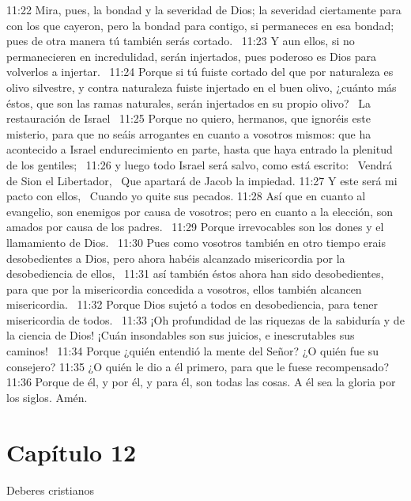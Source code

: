 11:22 Mira, pues, la bondad y la severidad de Dios; la severidad ciertamente para con los que cayeron, pero la bondad para contigo, si permaneces en esa bondad; pues de otra manera tú también serás cortado.  
11:23 Y aun ellos, si no permanecieren en incredulidad, serán injertados, pues poderoso es Dios para volverlos a injertar.  
11:24 Porque si tú fuiste cortado del que por naturaleza es olivo silvestre, y contra naturaleza fuiste injertado en el buen olivo, ¿cuánto más éstos, que son las ramas naturales, serán injertados en su propio olivo?  
La restauración de Israel  
11:25 Porque no quiero, hermanos, que ignoréis este misterio, para que no seáis arrogantes en cuanto a vosotros mismos: que ha acontecido a Israel endurecimiento en parte, hasta que haya entrado la plenitud de los gentiles;  
11:26 y luego todo Israel será salvo, como está escrito:  
Vendrá de Sion el Libertador,  
Que apartará de Jacob la impiedad. 
11:27 Y este será mi pacto con ellos,  
Cuando yo quite sus pecados. 
11:28 Así que en cuanto al evangelio, son enemigos por causa de vosotros; pero en cuanto a la elección, son amados por causa de los padres.  
11:29 Porque irrevocables son los dones y el llamamiento de Dios.  
11:30 Pues como vosotros también en otro tiempo erais desobedientes a Dios, pero ahora habéis alcanzado misericordia por la desobediencia de ellos,  
11:31 así también éstos ahora han sido desobedientes, para que por la misericordia concedida a vosotros, ellos también alcancen misericordia.  
11:32 Porque Dios sujetó a todos en desobediencia, para tener misericordia de todos.  
11:33 ¡Oh profundidad de las riquezas de la sabiduría y de la ciencia de Dios! ¡Cuán insondables son sus juicios, e inescrutables sus caminos!  
11:34 Porque ¿quién entendió la mente del Señor? ¿O quién fue su consejero? 
11:35 ¿O quién le dio a él primero, para que le fuese recompensado? 
11:36 Porque de él, y por él, y para él, son todas las cosas. A él sea la gloria por los siglos. Amén.  
\section*{Capítulo 12}
Deberes cristianos  

